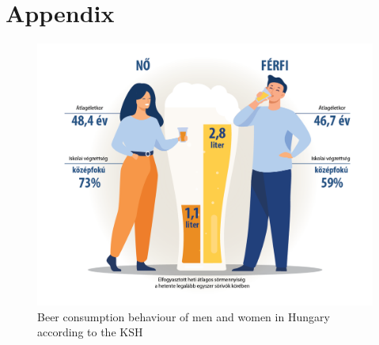 \newpage

\section{Appendix}

\begin{figure}[H]
  \centering
  \includegraphics[width=0.65\linewidth]{pics/ksh.png}
  \caption{Beer consumption behaviour of men and women in Hungary according to the KSH}
  \label{fig:ksh}
\end{figure}


